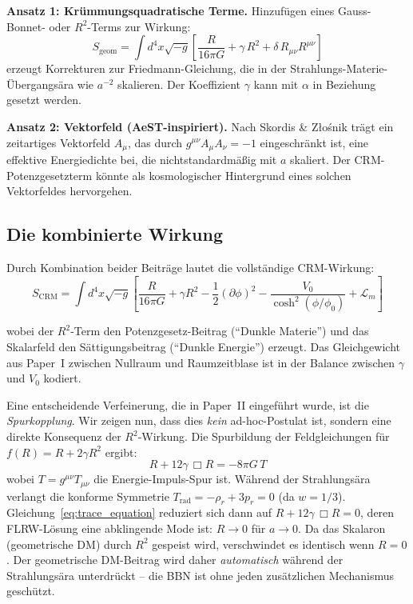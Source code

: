 \documentclass[11pt,a4paper]{article}
\begin{document}
\textbf{Ansatz 1: Kr\"ummungsquadratische Terme.} Hinzuf\"ugen eines Gauss-Bonnet- oder $R^2$-Terms zur Wirkung:
\begin{equation}
S_{\mathrm{geom}} = \int d^4x \sqrt{-g} \left[\frac{R}{16\pi G} + \gamma\, R^2 + \delta\, R_{\mu\nu}R^{\mu\nu}\right]
\end{equation}
erzeugt Korrekturen zur Friedmann-Gleichung, die in der Strahlungs-Materie-\"Ubergangs\"ara wie $a^{-2}$ skalieren. Der Koeffizient $\gamma$ kann mit $\alpha$ in Beziehung gesetzt werden.

\textbf{Ansatz 2: Vektorfeld (AeST-inspiriert).} Nach Skordis \& Z{\l}o\'snik \cite{Skordis2021} tr\"agt ein zeitartiges Vektorfeld $A_\mu$, das durch $g^{\mu\nu}A_\mu A_\nu = -1$ eingeschr\"ankt ist, eine effektive Energiedichte bei, die nichtstandardm\"a\ss ig mit $a$ skaliert. Der CRM-Potenzgesetzterm k\"onnte als kosmologischer Hintergrund eines solchen Vektorfeldes hervorgehen.

\subsection{Die kombinierte Wirkung}

Durch Kombination beider Beitr\"age lautet die vollst\"andige CRM-Wirkung:
\begin{equation}
{S_{\mathrm{CRM}} = \int d^4x \sqrt{-g} \left[\frac{R}{16\pi G} + \gamma R^2 - \frac{1}{2}(\partial\phi)^2 - \frac{V_0}{\cosh^2(\phi/\phi_0)} + \mathcal{L}_m\right]}
\label{eq:full_action}
\end{equation}

wobei der $R^2$-Term den Potenzgesetz-Beitrag ("`Dunkle Materie"') und das Skalarfeld den S\"attigungsbeitrag ("`Dunkle Energie"') erzeugt. Das Gleichgewicht aus Paper~I zwischen Nullraum und Raumzeitblase ist in der Balance zwischen $\gamma$ und $V_0$ kodiert.

Eine entscheidende Verfeinerung, die in Paper~II \cite{Geiger2026b} eingef\"uhrt wurde, ist die \textit{Spurkopplung}. Wir zeigen nun, dass dies \textit{kein} ad-hoc-Postulat ist, sondern eine direkte Konsequenz der $R^2$-Wirkung. Die Spurbildung der Feldgleichungen f\"ur $f(R) = R + 2\gamma R^2$ ergibt:
\begin{equation}
R + 12\gamma\,\Box R = -8\pi G\,T
\label{eq:trace_equation}
\end{equation}
wobei $T = g^{\mu\nu}T_{\mu\nu}$ die Energie-Impuls-Spur ist. W\"ahrend der Strahlungs\"ara verlangt die konforme Symmetrie $T_{\mathrm{rad}} = -\rho_r + 3p_r = 0$ (da $w = 1/3$). Gleichung~\eqref{eq:trace_equation} reduziert sich dann auf $R + 12\gamma\,\Box R = 0$, deren FLRW-L\"osung eine abklingende Mode ist: $R \to 0$ f\"ur $a \to 0$. Da das Skalaron (geometrische DM) durch $R^2$ gespeist wird, verschwindet es identisch wenn $R = 0$. Der geometrische DM-Beitrag wird daher \textit{automatisch} w\"ahrend der Strahlungs\"ara unterdr\"uckt -- die BBN ist ohne jeden zus\"atzlichen Mechanismus gesch\"utzt.
\end{document}
